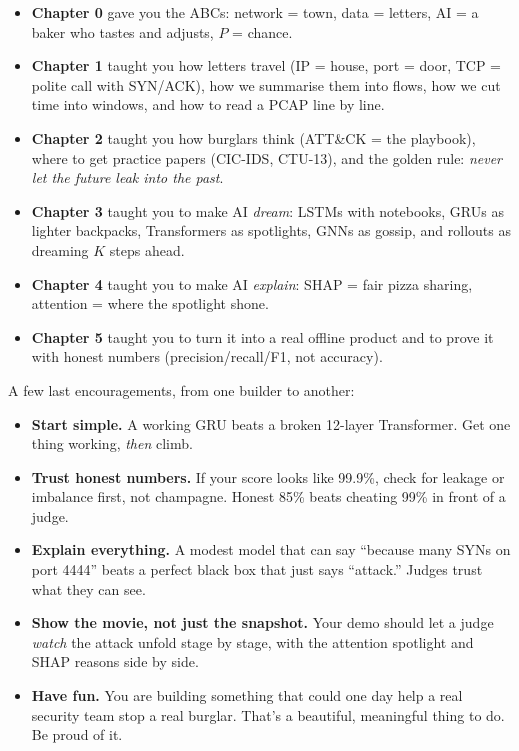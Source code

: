 \documentclass[11pt,a4paper]{article}
\begin{document}
\begin{itemize}[leftmargin=1.6em,itemsep=2pt]
  \item \textbf{Chapter 0} gave you the ABCs: network = town, data = letters,
        AI = a baker who tastes and adjusts, $P$ = chance.
  \item \textbf{Chapter 1} taught you how letters travel (IP = house, port =
        door, TCP = polite call with SYN/ACK), how we summarise them into flows,
        how we cut time into windows, and how to read a PCAP line by line.
  \item \textbf{Chapter 2} taught you how burglars think (ATT\&CK = the
        playbook), where to get practice papers (CIC-IDS, CTU-13), and the
        golden rule: \emph{never let the future leak into the past}.
  \item \textbf{Chapter 3} taught you to make AI \emph{dream}: LSTMs with
        notebooks, GRUs as lighter backpacks, Transformers as spotlights, GNNs
        as gossip, and rollouts as dreaming $K$ steps ahead.
  \item \textbf{Chapter 4} taught you to make AI \emph{explain}: SHAP = fair
        pizza sharing, attention = where the spotlight shone.
  \item \textbf{Chapter 5} taught you to turn it into a real offline product
        and to prove it with honest numbers (precision/recall/F1, not accuracy).
\end{itemize}

A few last encouragements, from one builder to another:

\begin{itemize}[leftmargin=1.6em,itemsep=2pt]
  \item \textbf{Start simple.} A working GRU beats a broken 12-layer
        Transformer. Get one thing working, \emph{then} climb.

  \item \textbf{Trust honest numbers.} If your score looks like 99.9\%, check
        for leakage or imbalance first, not champagne. Honest 85\% beats
        cheating 99\% in front of a judge.

  \item \textbf{Explain everything.} A modest model that can say ``because
        many SYNs on port 4444'' beats a perfect black box that just says
        ``attack.'' Judges trust what they can see.

  \item \textbf{Show the movie, not just the snapshot.} Your demo should let a
        judge \emph{watch} the attack unfold stage by stage, with the attention
        spotlight and SHAP reasons side by side.

  \item \textbf{Have fun.} You are building something that could one day help
a real security team stop a real burglar. That's a beautiful, meaningful
thing to do. Be proud of it.
\end{itemize}
\end{document}
